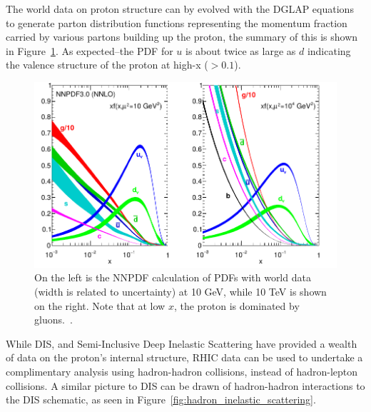 The world data on proton structure can by evolved with the DGLAP
equations~\cite{Ellis1974} to generate parton distribution functions
representing the momentum fraction carried by various partons building up the
proton, the summary of this is shown in Figure~\ref{fig:unpolarized_pdf}. As expected--the PDF for $u$ is about twice as large as $d$
indicating the valence structure of the proton at high-x ($>0.1$). 

\begin{figure}[ht]
  \centering
  \includegraphics[width=0.7\linewidth]{./figures/unpolarized_pdfs.pdf}
  \caption{
    On the left is the NNPDF calculation of PDFs with world data (width is
    related to uncertainty) at 10 GeV, while 10 TeV is shown on the right. Note
    that at low $x$, the proton is dominated by
    gluons.~\cite{ReviewEidelman2012}.
  } 
  \label{fig:unpolarized_pdf}
\end{figure}

While DIS, and Semi-Inclusive Deep Inelastic Scattering have provided a wealth
of data on the proton's internal structure, RHIC data can be used to undertake a
complimentary analysis using hadron-hadron collisions, instead of hadron-lepton
collisions. A similar picture to DIS can be drawn of hadron-hadron interactions
to the DIS schematic, as seen in Figure~\ref{fig:hadron_inelastic_scattering}.

